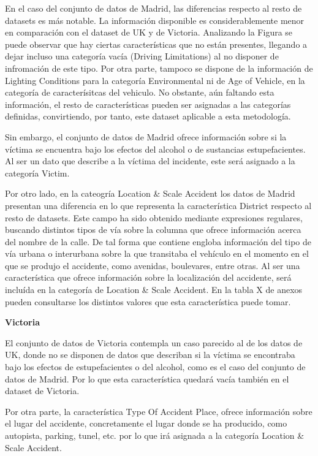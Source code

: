 \documentclass{uathesis-es}
\begin{document}
En el caso del conjunto de datos de Madrid, las diferencias respecto al resto de datasets es más notable. La información disponible es considerablemente menor en comparación con el dataset de UK y de Victoria. Analizando la Figura se puede observar que hay ciertas características que no están presentes, llegando a dejar incluso una categoría vacía (Driving Limitations) al no disponer de infromación de este tipo. Por otra parte, tampoco se dispone de la información de Lighting Conditions para la categoría Environmental ni de Age of Vehicle, en la categoría de caracterísitcas del vehiculo. No obstante, aún faltando esta información, el resto de características pueden ser asignadas a las categorías definidas, convirtiendo, por tanto, este dataset aplicable a esta metodología.

Sin embargo, el conjunto de datos de Madrid ofrece información sobre si la víctima se encuentra bajo los efectos del alcohol o de sustancias estupefacientes. Al ser un dato que describe a la víctima del incidente, este será asignado a la categoría Victim.

Por otro lado, en la cateogría Location \& Scale Accident los datos de Madrid presentan una diferencia en lo que representa la característica District respecto al resto de datasets. Este campo ha sido obtenido mediante expresiones regulares, buscando distintos tipos de vía sobre la columna que ofrece información acerca del nombre de la calle. De tal forma que contiene engloba información del tipo de vía urbana o interurbana sobre la que transitaba el vehículo en el momento en el que se produjo el accidente, como avenidas, boulevares, entre otras. Al ser una característica que ofrece información sobre la localización del accidente, será incluída en la categoría de Location \& Scale Accident. En la tabla X de anexos pueden consultarse los distintos valores que esta característica puede tomar.

\textbf{Victoria}

El conjunto de datos de Victoria contempla un caso parecido al de los datos de UK, donde no se disponen de datos que describan si la víctima se encontraba bajo los efectos de estupefacientes o del alcohol, como es el caso del conjunto de datos de Madrid. Por lo que esta característica quedará vacía también en el dataset de Victoria.

Por otra parte, la característica Type Of Accident Place, ofrece información sobre el lugar del accidente, concretamente el lugar donde se ha producido, como autopista, parking, tunel, etc. por lo que irá asignada a la categoría Location \& Scale Accident.
\end{document}
